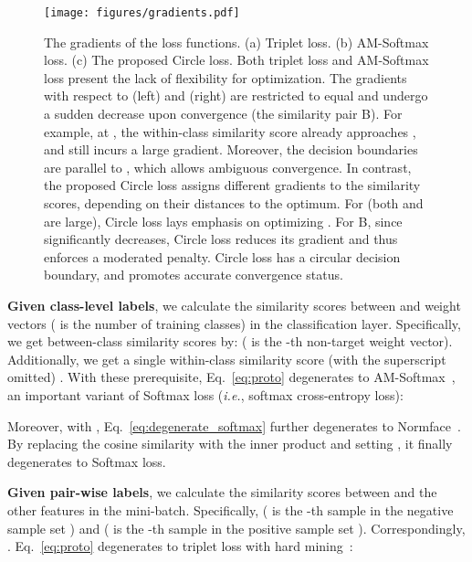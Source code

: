 \documentclass[10pt,twocolumn,letterpaper]{article}
\begin{document}
\begin{figure*}[t!]
	\centering
	\texttt{[image: figures/gradients.pdf]}
	\caption{The gradients of the loss functions. (a) Triplet loss. (b) AM-Softmax loss. (c) The proposed Circle loss. Both triplet loss and AM-Softmax loss present the lack of flexibility for optimization. The gradients with respect to  (left) and  (right) are restricted to equal and undergo a sudden decrease upon convergence (the similarity pair B). For example, at , the within-class similarity score  already approaches , and still incurs a large gradient. Moreover, the decision boundaries are parallel to , which allows ambiguous convergence. In contrast, the proposed Circle loss assigns different gradients to the similarity scores, depending on their distances to the optimum. For  (both  and  are large), Circle loss lays emphasis on optimizing . For B, since  significantly decreases, Circle loss reduces its gradient and thus enforces a moderated penalty. Circle loss has a circular decision boundary, and promotes accurate convergence status.}
	\vspace{-4mm}
	\label{fig:gradient}
\end{figure*}

\textbf{Given class-level labels}, we calculate the similarity scores between  and weight vectors  ( is the number of training classes) in the classification layer. Specifically, we get  between-class similarity scores by:  ( is the -th non-target weight vector). Additionally, we get a single within-class similarity score (with the superscript omitted) . 
With these prerequisite, Eq.~\ref{eq:proto} degenerates to AM-Softmax~\cite{wang2018additive,Wang_2018_CVPR}, an important variant of Softmax loss (\emph{i.e.}, softmax cross-entropy loss):

 

Moreover, with , Eq.~\ref{eq:degenerate_softmax} further degenerates to Normface~\cite{wang2017normface}.
By replacing the cosine similarity with the inner product and setting , it finally degenerates to Softmax loss.

\textbf{Given pair-wise labels}, we calculate the similarity scores between  and the other features in the mini-batch. Specifically,
 ( is the -th sample in the negative sample set ) and  ( is the -th sample in the positive sample set ). Correspondingly, . Eq.~\ref{eq:proto} degenerates to triplet loss with hard mining~\cite{schroff2015facenet, hermans2017defense}:

 
\end{document}
